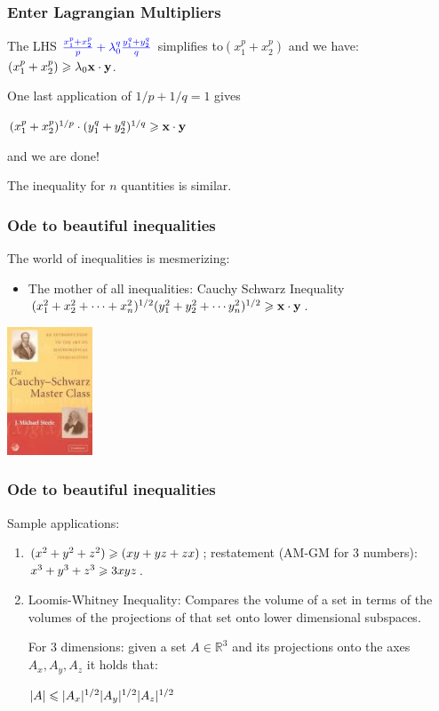 \documentclass{beamer}
\begin{document}
\begin{frame}
\frametitle{Enter Lagrangian Multipliers}
The LHS ${\color{blue}\frac{x_1^p + x_2^p}{p}+{\color{blue}\lambda_0^q}\frac{y_1^q + y_2^q}{q}}$ simplifies to$(x_1^p + x_2^p)$ and we have: $(x_1^p + x_2^p) \geqslant \lambda_0 \mathbf{x}\cdot \mathbf{y}$.

One last application of $1/p + 1/q = 1$ gives 
\begin{center}
$(x_1^p + x_2^p)^{1/p}\cdot (y_1^q + y_2^q)^{1/q} \geqslant \mathbf{x}\cdot \mathbf{y}$
\end{center}
and we are done!
\pause

The inequality for $n$ quantities is similar.
\end{frame}

\begin{frame}
\frametitle{Ode to beautiful inequalities}
The world of inequalities is mesmerizing:
\begin{itemize}
\item 
The mother of all inequalities: Cauchy Schwarz Inequality
$(x_1^2 + x_2^2 + \cdots + x_n^2)^{1/2}(y_1^2 + y_2^2 + \cdots y_n^2)^{1/2} \geqslant \mathbf{x}\cdot\mathbf{y}$.
\end{itemize}
\begin{center}
\includegraphics[height=1.5in]{cauchySchwarzMasterClass.jpeg}
\end{center}
\end{frame}

\begin{frame}
\frametitle{Ode to beautiful inequalities}
Sample applications:
\begin{enumerate}
\item $(x^2 + y^2 + z^2) \geqslant (xy + yz + zx)$; restatement (AM-GM for $3$ numbers): $x^3 + y^3 + z^3 \geqslant 3xyz$.
\item Loomis-Whitney Inequality: Compares the volume of a set in terms of the volumes of the projections of that 
set onto lower dimensional subspaces. 

For $3$ dimensions: given a set $A \in \mathbb{R}^3$ and its projections onto the axes $A_x, A_y, A_z$ it holds that:
\begin{center}
$|A| \leqslant |A_x|^{1/2}|A_y|^{1/2}|A_z|^{1/2}$
\end{center}
\end{enumerate}
\end{frame}
\end{document}
